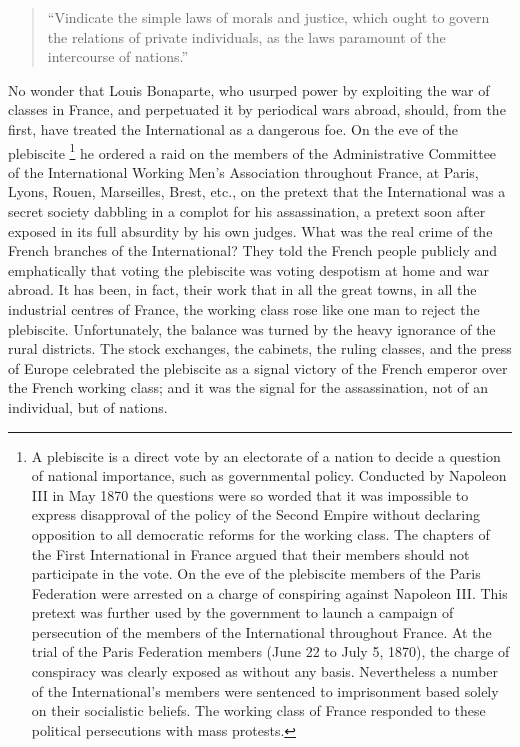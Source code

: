 \documentclass{book}
\begin{document}
\begin{quote}

``Vindicate the simple laws of morals and justice, which ought to govern
the relations of private individuals, as the laws paramount of the
intercourse of nations.”

\end{quote}

No wonder that Louis Bonaparte, who usurped power by exploiting the war of
classes in France, and perpetuated it by periodical wars abroad, should,
from the first, have treated the International as a dangerous foe. On the
eve of the plebiscite \footnote{A plebiscite is a direct vote by an
electorate of a nation to decide a question of national importance, such
as governmental policy. Conducted by Napoleon III in May 1870 the
questions were so worded that it was impossible to express disapproval of
the policy of the Second Empire without declaring opposition to all
democratic reforms for the working class. The chapters of the First
International in France argued that their members should not participate
in the vote. On the eve of the plebiscite members of the Paris Federation
were arrested on a charge of conspiring against Napoleon III. This pretext
was further used by the government to launch a campaign of persecution of
the members of the International throughout France. At the trial of the
Paris Federation members (June 22 to July 5, 1870), the charge of
conspiracy was clearly exposed as without any basis. Nevertheless a number
of the International’s members were sentenced to imprisonment based solely
on their socialistic beliefs. The working class of France responded to
these political persecutions with mass protests.} he ordered a raid on the
members of the Administrative Committee of the International Working Men’s
Association throughout France, at Paris, Lyons, Rouen, Marseilles, Brest,
etc., on the pretext that the International was a secret society dabbling
in a complot for his assassination, a pretext soon after exposed in its
full absurdity by his own judges. What was the real crime of the French
branches of the International? They told the French people publicly and
emphatically that voting the plebiscite was voting despotism at home and
war abroad. It has been, in fact, their work that in all the great towns,
in all the industrial centres of France, the working class rose like one
man to reject the plebiscite. Unfortunately, the balance was turned by the
heavy ignorance of the rural districts. The stock exchanges, the cabinets,
the ruling classes, and the press of Europe celebrated the plebiscite as
a signal victory of the French emperor over the French working class; and
it was the signal for the assassination, not of an individual, but of
nations.
\end{document}
